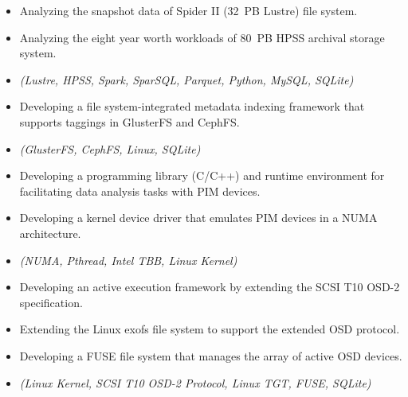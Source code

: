\begin{itemize}
 \item {Analyzing the snapshot data of Spider II (32~PB Lustre) file system.}
 \item {Analyzing the eight year worth workloads of 80~PB HPSS archival storage system.}
 \item {\it\small (Lustre, HPSS, Spark, SparSQL, Parquet, Python, MySQL, SQLite)}
\end{itemize}

\begin{itemize}
 \item {Developing a file system-integrated metadata indexing framework that supports taggings in GlusterFS and CephFS.}
 \item {\it\small (GlusterFS, CephFS, Linux, SQLite)}
\end{itemize}

\begin{itemize}
    \item {Developing a programming library (C/C++) and runtime environment for
             facilitating data analysis tasks with PIM devices.}
    \item {Developing a kernel device driver that emulates PIM devices in a NUMA architecture.}
    \item {\it\small(NUMA, Pthread, Intel TBB, Linux Kernel)}
\end{itemize}

\begin{itemize}
 \item {Developing an active execution framework by extending the SCSI T10 OSD-2
       specification.}
 \item {Extending the Linux exofs file system to support the extended OSD protocol.}
 \item {Developing a FUSE file system that manages the array of active OSD devices.}
 \item {\it\small(Linux Kernel, SCSI T10 OSD-2 Protocol, Linux TGT, FUSE, SQLite)}
\end{itemize}

